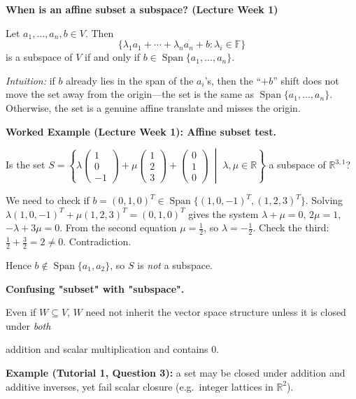 \begin{keyformula}
\textbf{When is an affine subset a subspace? (Lecture Week 1)}

Let $a_1,\dots,a_n,b\in V$.  Then
\[
\{\lambda_1 a_1+\cdots+\lambda_n a_n+b : \lambda_i\in\mathbb{F}\}
\]
is a subspace of $V$ if and only if $b\in\operatorname{Span}\{a_1,\dots,a_n\}$.

\medskip
\emph{Intuition:} if $b$ already lies in the span of the $a_i$'s, then the ``$+b$'' shift does not move the set away from the origin---the set is the same as $\operatorname{Span}\{a_1,\dots,a_n\}$.  Otherwise, the set is a genuine affine translate and misses the origin.
\end{keyformula}

\begin{examplebox}
\textbf{Worked Example (Lecture Week 1): Affine subset test.}

Is the set
$\displaystyle S=\left\{\lambda\begin{pmatrix}1\\0\\-1\end{pmatrix}+\mu\begin{pmatrix}1\\2\\3\end{pmatrix}+\begin{pmatrix}0\\1\\0\end{pmatrix}\;\middle|\;\lambda,\mu\in\mathbb{R}\right\}$
a subspace of $\mathbb{R}^{3,1}$?

We need to check if $b=(0,1,0)^T\in\operatorname{Span}\{(1,0,-1)^T,(1,2,3)^T\}$.
Solving $\lambda(1,0,-1)^T+\mu(1,2,3)^T=(0,1,0)^T$ gives the system $\lambda+\mu=0$, $2\mu=1$, $-\lambda+3\mu=0$.
From the second equation $\mu=\tfrac{1}{2}$, so $\lambda=-\tfrac{1}{2}$.
Check the third: $\tfrac{1}{2}+\tfrac{3}{2}=2\neq 0$.  Contradiction.

Hence $b\notin\operatorname{Span}\{a_1,a_2\}$, so $S$ is \emph{not} a subspace.
\end{examplebox}

\begin{commonmistake}

\textbf{Confusing "subset" with "subspace".}

Even if $W\subseteq V$, $W$ need not inherit the vector space structure unless it is closed under \emph{both}

addition and scalar multiplication and contains $0$.

\medskip

\textbf{Example (Tutorial 1, Question 3):} a set may be closed under addition and additive inverses, yet fail scalar closure (e.g.\ integer lattices in $\mathbb{R}^2$).

\end{commonmistake}

